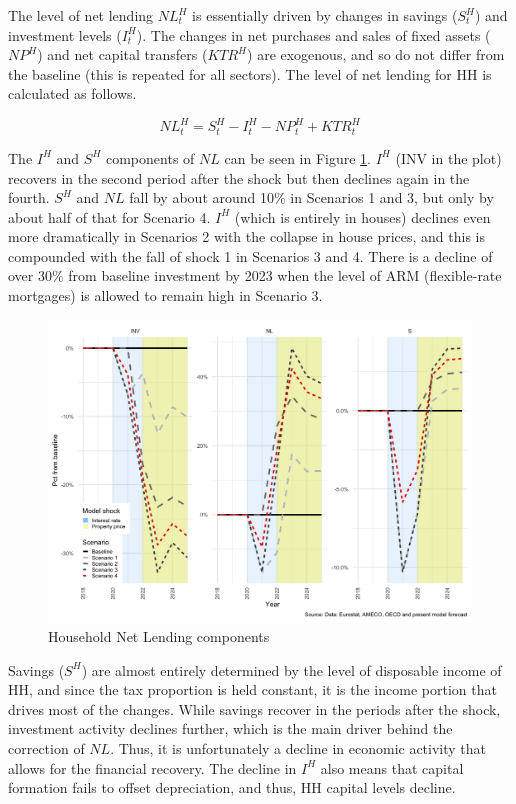 \documentclass[
]{book}
\begin{document}
The level of net lending \(NL^H_t\) is essentially driven by changes in savings (\(S^H_t\)) and investment levels (\(I^H_t\)). The changes in net purchases and sales of fixed assets (\(NP^H\)) and net capital transfers (\(KTR^H\)) are exogenous, and so do not differ from the baseline (this is repeated for all sectors). The level of net lending for HH is calculated as follows.

\begin{equation}
NL^H_t = S^H_t - I^H_t - NP^H_t + KTR^H_t
\end{equation}

The \(I^H\) and \(S^H\) components of \(NL\) can be seen in Figure \ref{fig:fl-fi-sfc-plot-hh-indicators-nl}. \(I^H\) (INV in the plot) recovers in the second period after the shock but then declines again in the fourth. \(S^H\) and \(NL\) fall by about around 10\% in Scenarios 1 and 3, but only by about half of that for Scenario 4. \(I^H\) (which is entirely in houses) declines even more dramatically in Scenarios 2 with the collapse in house prices, and this is compounded with the fall of shock 1 in Scenarios 3 and 4. There is a decline of over 30\% from baseline investment by 2023 when the level of ARM (flexible-rate mortgages) is allowed to remain high in Scenario 3.

\begin{figure}[H]
\includegraphics[width=0.95\linewidth]{figures/fl-fi-sfc-plot-hh-indicators-nl-1} \caption{Household Net Lending components}\label{fig:fl-fi-sfc-plot-hh-indicators-nl}
\end{figure}

Savings (\(S^H\)) are almost entirely determined by the level of disposable income of HH, and since the tax proportion is held constant, it is the income portion that drives most of the changes. While savings recover in the periods after the shock, investment activity declines further, which is the main driver behind the correction of \(NL\). Thus, it is unfortunately a decline in economic activity that allows for the financial recovery. The decline in \(I^H\) also means that capital formation fails to offset depreciation, and thus, HH capital levels decline.
\end{document}
